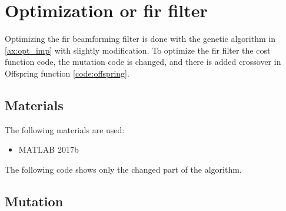 \chapter{Optimization or \gls{fir} filter}\label{ax:opt_imp}
Optimizing the \gls{fir} beamforming filter is done with the genetic algorithm in \autoref{ax:opt_imp} with slightly modification. To optimize the \gls{fir} filter the cost function code, the mutation code is changed, and there is added crossover in Offspring function \autoref{code:offspring}.


\section*{Materials}
The following materials are used:
\begin{itemize}
\item MATLAB 2017b
\end{itemize}

The following code shows only the changed part of the algorithm.


\section{Mutation}\label{axs:mutation}
